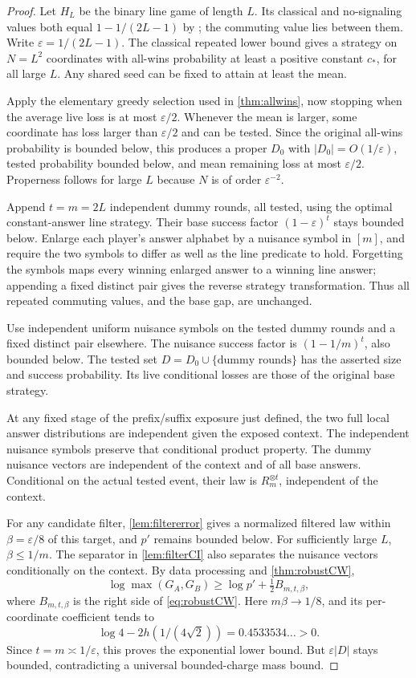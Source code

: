 \documentclass[11pt,reqno]{amsart}
\numberwithin{equation}{section}
\theoremstyle{definition}
\theoremstyle{remark}
\newcommand{\eps}{\varepsilon}
\begin{document}
\begin{proof}
Let \(H_L\) be the binary line game of length \(L\). Its classical and no-signaling values both equal \(1-1/(2L-1)\) by \cite[Definition~3.1 and Theorem~3.2]{KR}; the commuting value lies between them. Write \(\eps=1/(2L-1)\). The classical repeated lower bound \cite[Theorem~4.4]{KR} gives a strategy on \(N=L^2\) coordinates with all-wins probability at least a positive constant \(c_*\), for all large \(L\). Any shared seed can be fixed to attain at least the mean.

Apply the elementary greedy selection used in \cref{thm:allwins}, now stopping when the average live loss is at most \(\eps/2\). Whenever the mean is larger, some coordinate has loss larger than \(\eps/2\) and can be tested. Since the original all-wins probability is bounded below, this produces a proper \(D_0\) with \(|D_0|=O(1/\eps)\), tested probability bounded below, and mean remaining loss at most \(\eps/2\). Properness follows for large \(L\) because \(N\) is of order \(\eps^{-2}\).

Append \(t=m=2L\) independent dummy rounds, all tested, using the optimal constant-answer line strategy. Their base success factor \((1-\eps)^t\) stays bounded below. Enlarge each player's answer alphabet by a nuisance symbol in \([m]\), and require the two symbols to differ as well as the line predicate to hold. Forgetting the symbols maps every winning enlarged answer to a winning line answer; appending a fixed distinct pair gives the reverse strategy transformation. Thus all repeated commuting values, and the base gap, are unchanged.

Use independent uniform nuisance symbols on the tested dummy rounds and a fixed distinct pair elsewhere. The nuisance success factor is \((1-1/m)^t\), also bounded below. The tested set \(D=D_0\cup\{\text{dummy rounds}\}\) has the asserted size and success probability. Its live conditional losses are those of the original base strategy.

At any fixed stage of the prefix/suffix exposure just defined, the two full local answer distributions are independent given the exposed context. The independent nuisance symbols preserve that conditional product property. The dummy nuisance vectors are independent of the context and of all base answers. Conditional on the actual tested event, their law is \(R_m^{\otimes t}\), independent of the context.

For any candidate filter, \cref{lem:filtererror} gives a normalized filtered law within \(\beta=\eps/8\) of this target, and \(p'\) remains bounded below. For sufficiently large \(L\), \(\beta\le1/m\). The separator in \cref{lem:filterCI} also separates the nuisance vectors conditionally on the context. By data processing and \cref{thm:robustCW},
\[
 \log\max(G_A,G_B)\ge\log p'+\tfrac12 B_{m,t,\beta},
\]
where \(B_{m,t,\beta}\) is the right side of \eqref{eq:robustCW}. Here \(m\beta\to1/8\), and its per-coordinate coefficient tends to
\[
 \log4-2h(1/(4\sqrt2))=0.4533534\ldots>0.
\]
Since \(t=m\asymp1/\eps\), this proves the exponential lower bound. But \(\eps|D|\) stays bounded, contradicting a universal bounded-charge mass bound.
\end{proof}
\end{document}
